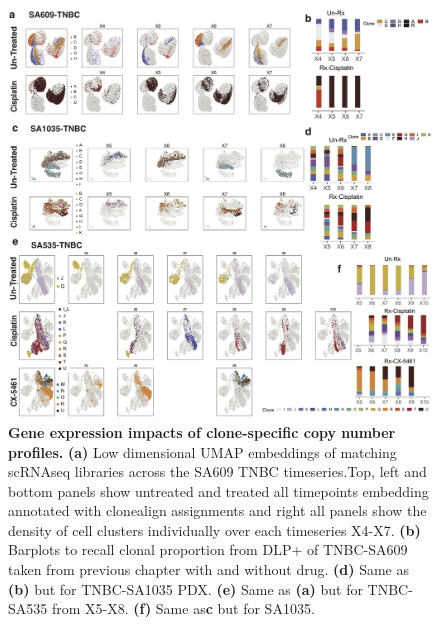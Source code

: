 \begin{figure}
\centering
\includegraphics[width=\textwidth]{Figures/chap5/EmbeddingsRNA.png}
	
\caption[Gene expression impacts of clone-specific copy number profiles]
	{\small
	\textbf{Gene expression impacts of clone-specific copy number profiles.}
	    \textbf{(a)} Low dimensional \ac{UMAP} embeddings of matching scRNAseq libraries across the SA609 TNBC timeseries.Top, left and bottom panels show untreated and treated all timepoints embedding annotated with clonealign assignments and right all panels show the density of cell clusters individually over each timeseries X4-X7.
	     \textbf{(b)} Barplots to recall clonal proportion from DLP+ of TNBC-SA609 taken from previous chapter with and without drug. 
	     \textbf{(d)} Same as \textbf{(b)} but for TNBC-SA1035 PDX. \textbf{(e)} Same as \textbf{(a)} but for TNBC-SA535  from X5-X8. \textbf{(f)} Same as\textbf{c} but for SA1035. 
	}
	\label{fig:EmbeddingsRNA}
\end{figure}




